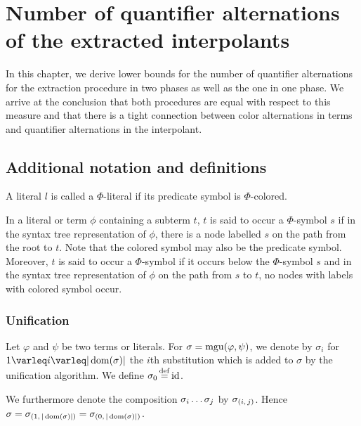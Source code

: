 \documentclass[,%
	draft=false,%
	numbers=noendperiod
	12pt,
	a4paper,
	oneside,%
	openany,
]{memoir}
\begin{document}
\chapter{ Number of quantifier alternations of the extracted interpolants }

In this chapter, we derive lower bounds for the number of quantifier alternations for the extraction procedure in two phases as well as the one in one phase.
We arrive at the conclusion that both procedures are equal with respect to this measure and that there is a tight connection between color alternations in terms and quantifier alternations in the interpolant.



\section{Additional notation and definitions}

A literal $l$ is called a $\Phi$-literal if its predicate symbol is $\Phi$-colored.

In a literal or term $\phi$ containing a subterm $t$, $t$ is said to occur  a $\Phi$-symbol $s$ if in the syntax tree representation of $\phi$, there is a node labelled $s$ on the path from the root to $t$. Note that the colored symbol may also be the predicate symbol.
Moreover, $t$ is said to occur  a $\Phi$-symbol if it occurs below the $\Phi$-symbol $s$ and in the syntax tree representation of $\phi$ on the path from $s$ to $t$, no nodes with labels with colored symbol occur.


\subsection{Unification}

Let $\varphi$ and $\psi$ be two terms or literals.
For $\sigma = \operatorname{mgu}(\varphi, \psi)$, we denote by $\sigma_i$ for $1\varleq i \varleq |\dom(\sigma)|$ the $i$th substitution which is added to $\sigma$ by the unification algorithm.
We define $\sigma_0 \defeq \id$.

We furthermore denote the composition $\sigma_i \dots \sigma_j$ by $\sigma_{(i,\,j)}$.
Hence $\sigma = \sigma_{(1,\,|\operatorname{dom}(\sigma)|)} = \sigma_{(0,\,|\operatorname{dom}(\sigma)|)}$.
\end{document}
